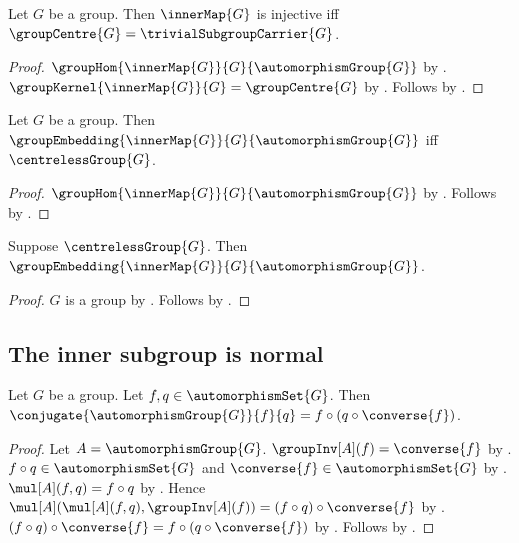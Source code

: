 \begin{theorem}\label{inner_map_injective_iff_centre_trivial}
    Let $G$ be a group.
    Then $\innerMap{G}$ is injective iff
        $\groupCentre{G}=\trivialSubgroupCarrier{G}$.
\end{theorem}
\begin{proof}
    $\groupHom{\innerMap{G}}{G}{\automorphismGroup{G}}$ by
        .
    $\groupKernel{\innerMap{G}}{G}
        =\groupCentre{G}$ by
        .
    Follows by .
\end{proof}

\begin{theorem}\label{inner_map_embedding_iff_centreless}
    Let $G$ be a group.
    Then $\groupEmbedding
        {\innerMap{G}}{G}{\automorphismGroup{G}}$ iff
        $\centrelessGroup{G}$.
\end{theorem}
\begin{proof}
    $\groupHom{\innerMap{G}}{G}{\automorphismGroup{G}}$ by
        .
    Follows by
        .
\end{proof}

\begin{corollary}\label{centreless_inner_map_embedding}
    Suppose $\centrelessGroup{G}$.
    Then $\groupEmbedding
        {\innerMap{G}}{G}{\automorphismGroup{G}}$.
\end{corollary}
\begin{proof}
    $G$ is a group by .
    Follows by .
\end{proof}

\subsection{The inner subgroup is normal}

\begin{proposition}\label{automorphism_group_conjugate_apply}
    Let $G$ be a group.
    Let $f,q\in\automorphismSet{G}$.
    Then
        $\conjugate{\automorphismGroup{G}}{f}{q}=
            f\circ(q\circ\converse{f})$.
\end{proposition}
\begin{proof}
    Let $A=\automorphismGroup{G}$.
    $\groupInv[A](f)=\converse{f}$ by
        .
    $f\circ q\in\automorphismSet{G}$ and
        $\converse{f}\in\automorphismSet{G}$ by
        .
    $\mul[A](f,q)=f\circ q$ by
        .
    Hence
        $\mul[A](\mul[A](f,q),\groupInv[A](f))=
            (f\circ q)\circ\converse{f}$ by
        .
    $(f\circ q)\circ\converse{f}=f\circ(q\circ\converse{f})$ by
        .
    Follows by .
\end{proof}


